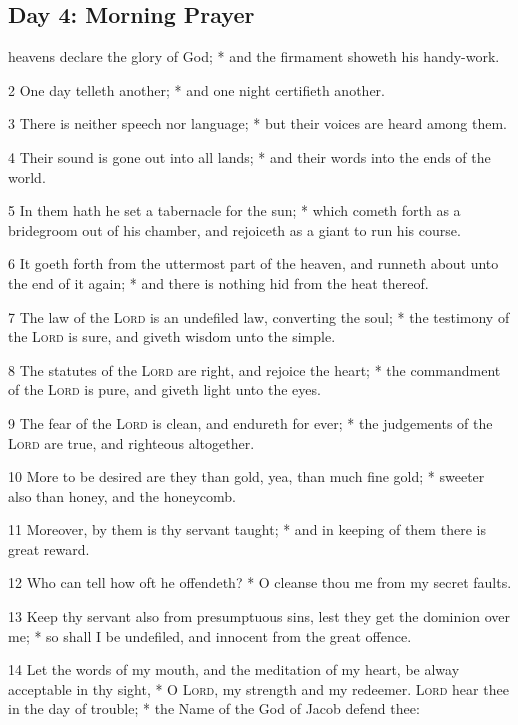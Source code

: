 \subsection{Day 4: Morning Prayer}
 heavens declare the glory of God; * and the firmament showeth his handy-work.\par
2 One day telleth another; * and one night certifieth another.\par
3 There is neither speech nor language; * but their voices are heard among them.\par
4 Their sound is gone out into all lands; * and their words into the ends of the world.\par
5 In them hath he set a tabernacle for the sun; * which cometh forth as a bridegroom out of his chamber, and rejoiceth as a giant to run his course.\par
6 It goeth forth from the uttermost part of the heaven, and runneth about unto the end of it again; * and there is nothing hid from the heat thereof.\par
7 The law of the {\textsc{Lord}} is an undefiled law, converting the soul; * the testimony of the {\textsc{Lord}} is sure, and giveth wisdom unto the simple.\par
8 The statutes of the {\textsc{Lord}} are right, and rejoice the heart; * the commandment of the {\textsc{Lord}} is pure, and giveth light unto the eyes.\par
9 The fear of the {\textsc{Lord}} is clean, and endureth for ever; * the judgements of the {\textsc{Lord}} are true, and righteous altogether.\par
10 More to be desired are they than gold, yea, than much fine gold; * sweeter also than honey, and the honeycomb.\par
11 Moreover, by them is thy servant taught; * and in keeping of them there is great reward.\par
12 Who can tell how oft he offendeth? * O cleanse thou me from my secret faults.\par
13 Keep thy servant also from presumptuous sins, lest they get the dominion over me; * so shall I be undefiled, and innocent from the great offence.\par
14 Let the words of my mouth, and the meditation of my heart, be alway acceptable in thy sight, * O {\textsc{Lord}}, my strength and my redeemer.
 {\textsc{Lord}} hear thee in the day of trouble; * the Name of the God of Jacob defend thee:\par
